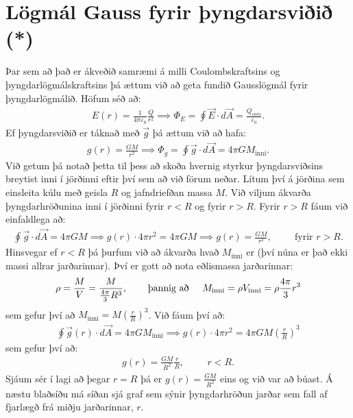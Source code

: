 \section{Lögmál Gauss fyrir þyngdarsviðið (*)}

Þar sem að það er ákveðið samræmi á milli Coulombskraftsins og þyngdarlögmálskraftsins þá ættum við að geta fundið Gausslögmál fyrir þyngdarlögmálið. Höfum séð að:
\begin{align*}
    E(r) = \frac{1}{4\pi \varepsilon_0} \frac{Q}{r^2} \implies \Phi_E = \oint  \vec{E} \cdot d\vec{A} = \frac{Q_{inni}}{\varepsilon_0}.
\end{align*}
Ef þyngdarsviðið er táknað með $\vec{g}$ þá ættum við að hafa:
\begin{align*}
    g(r) = \frac{GM}{r^2} \implies \Phi_g = \oint \vec{g} \cdot d\vec{A} = 4\pi G M_{\text{inni}}.
\end{align*}
Við getum þá notað þetta til þess að skoða hvernig styrkur þyngdarsviðsins breytist inni í jörðinni eftir því sem að við förum neðar. Lítum því á jörðina sem einsleita kúlu með geisla $R$ og jafndriefðan massa $M$. Við viljum ákvarða þyngdarhröðunina inni í jörðinni fyrir $r < R$ og fyrir $r > R$. Fyrir $r > R$ fáum við einfaldlega að:
\begin{align*}
    \oint \vec{g} \cdot d\vec{A} = 4\pi GM \implies g(r) \cdot 4 \pi r^2 = 4\pi G M \implies g(r) = \frac{GM}{r^2}, \hspace{1cm} \text{fyrir $r > R$.}
\end{align*}
Hinsvegar ef $r < R$ þá þurfum við að ákvarða hvað $M_{\text{inni}}$ er (því núna er það ekki massi allrar jarðarinnar). Því er gott að nota eðlismassa jarðarinnar:
\begin{align*}
    \rho = \frac{M}{V} = \frac{M}{\frac{4\pi}{3} R^3}, \hspace{0.75cm} \text{þannig að} \hspace{0.5cm} M_{\text{inni}} = \rho V_{\text{inni}} = \rho \frac{4\pi}{3}r^3
\end{align*}
sem gefur því að $M_{\text{inni}} = M\left( \frac{r}{R} \right)^3$. Við fáum því að:
\begin{align*}
    \oint \vec{g}(r) \cdot d \vec{A} = 4\pi G M_{\text{inni}} \implies g(r) \cdot 4\pi r^2 = 4\pi G M \left( \frac{r}{R} \right)^3
\end{align*}
sem gefur því að:
\begin{align*}
    g(r) = \frac{GM}{R^2} \frac{r}{R}, \hspace{1cm} r < R.
\end{align*}
Sjáum sér í lagi að þegar $r = R$ þá er $g(r) = \frac{GM}{R^2}$ eins og við var að búast. Á næstu blaðsíðu má síðan sjá graf sem sýnir þyngdarhröðun jarðar sem fall af fjarlægð frá miðju jarðarinnar, $r$.

